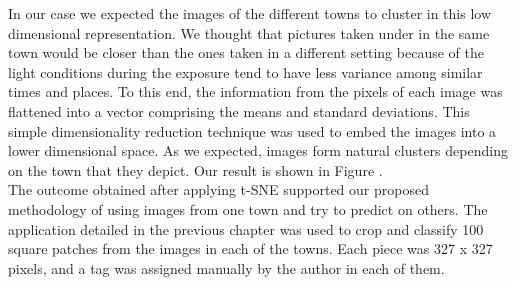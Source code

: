 In our case we expected the images of the different towns to cluster in this low dimensional representation. We thought that pictures taken under in the same town would be closer than the ones taken in a different setting because of the light conditions during the exposure tend to have less variance among similar times and places. To this end, the information from the pixels of each image was flattened into a vector comprising the means and standard deviations. This simple dimensionality reduction technique was used to embed the images into a lower dimensional space. As we expected, images form natural clusters depending on the town that they depict. Our result is shown in Figure \cite{fig:tsne}.\\

The outcome obtained after applying t-SNE supported our proposed methodology of using images from one town and try to predict on others. The application detailed in the previous chapter was used to crop and classify 100 square patches from the images in each of the towns. Each piece was 327 x 327 pixels, and a tag was assigned manually by the author in each of them.\\


